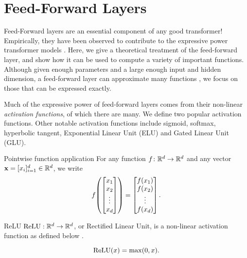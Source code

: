 %
\chapter{Feed-Forward Layers}
%


Feed-Forward layers are an essential component of any good transformer!
Empirically, they have been observed to contribute to the expressive power transformer models \cite{geva-etal-2021-transformer}.
Here, we give a theoretical treatment of the feed-forward layer, and show how it can be used to compute a variety of important functions.
Although given enough parameters and a large enough input and hidden dimension, a feed-forward layer can approximate many functions \cite{hornik1989multilayer}, we focus on those that can be expressed exactly.


Much of the expressive power of feed-forward layers comes from their non-linear \emph{activation functions}, of which there are many. We define two popular activation functions. Other notable activation functions include sigmoid, softmax, hyperbolic tangent, Exponential Linear Unit (ELU) and Gated Linear Unit (GLU).

\begin{definition}{Pointwise function application}{}
  For any function $f \colon \mathbb{R}^d \to \mathbb{R}^d$ and any vector $\mathbf{x} = [x_i]_{i=1}^d \in \mathbb{R}^d$, we write
  \begin{equation*}
    f\mleft(\begin{bmatrix} x_1 \\ x_2 \\ \vdots \\ x_d \end{bmatrix}\mright) =  \begin{bmatrix} f(x_1) \\ f(x_2) \\ \vdots \\ f(x_d) \end{bmatrix}.
  \end{equation*}
\end{definition}

\begin{definition}{ReLU}{}
    $\text{ReLU} : \mathbb{R}^d\to \mathbb{R}^d$, or Rectified Linear Unit, is a non-linear activation function as defined below \cite{Fukushima1975}.

    \[\text{ReLU}(x) = \max(0,x).\]
\end{definition}

